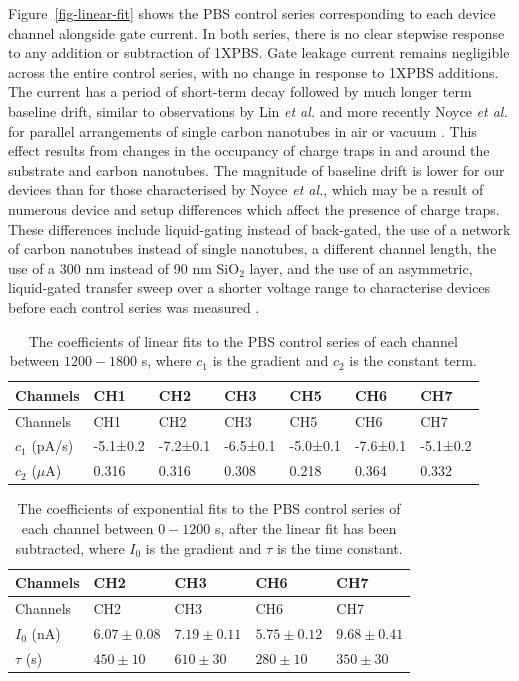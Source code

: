 \documentclass[
  a4paper,
]{scrbook}
\begin{document}
Figure~\ref{fig-linear-fit} shows the PBS control series corresponding
to each device channel alongside gate current. In both series, there is
no clear stepwise response to any addition or subtraction of 1XPBS. Gate
leakage current remains negligible across the entire control series,
with no change in response to 1XPBS additions. The current has a period
of short-term decay followed by much longer term baseline drift, similar
to observations by Lin \emph{et al.} and more recently Noyce \emph{et
al.} for parallel arrangements of single carbon nanotubes in air or
vacuum \autocite{Lin2006,Noyce2019}. This effect results from changes in
the occupancy of charge traps in and around the substrate and carbon
nanotubes. The magnitude of baseline drift is lower for our devices than
for those characterised by Noyce \emph{et al.}, which may be a result of
numerous device and setup differences which affect the presence of
charge traps. These differences include liquid-gating instead of
back-gated, the use of a network of carbon nanotubes instead of single
nanotubes, a different channel length, the use of a 300 nm instead of 90
nm SiO\(_2\) layer, and the use of an asymmetric, liquid-gated transfer
sweep over a shorter voltage range to characterise devices before each
control series was measured \autocite{Noyce2019}.

\hypertarget{tbl-linear-fits}{}
\begin{longtable}[]{@{}lllllll@{}}
\caption{\label{tbl-linear-fits}The coefficients of linear fits to the
PBS control series of each channel between \(1200-1800\) s, where
\(c_1\) is the gradient and \(c_2\) is the constant term.\\
}\tabularnewline
\toprule\noalign{}
Channels & CH1 & CH2 & CH3 & CH5 & CH6 & CH7 \\
\midrule\noalign{}
\endfirsthead
\toprule\noalign{}
Channels & CH1 & CH2 & CH3 & CH5 & CH6 & CH7 \\
\midrule\noalign{}
\endhead
\bottomrule\noalign{}
\endlastfoot
\(c_1\) (pA/s) & -5.1±0.2 & -7.2±0.1 & -6.5±0.1 & -5.0±0.1 & -7.6±0.1 &
-5.1±0.2 \\
\(c_2\) (\(\mu\)A) & 0.316 & 0.316 & 0.308 & 0.218 & 0.364 & 0.332 \\
\end{longtable}

\hypertarget{tbl-exp-fits}{}
\begin{longtable}[]{@{}lllll@{}}
\caption{\label{tbl-exp-fits}The coefficients of exponential fits to the
PBS control series of each channel between \(0-1200\) s, after the
linear fit has been subtracted, where \(I_0\) is the gradient and
\(\tau\) is the time constant.\\
}\tabularnewline
\toprule\noalign{}
Channels & CH2 & CH3 & CH6 & CH7 \\
\midrule\noalign{}
\endfirsthead
\toprule\noalign{}
Channels & CH2 & CH3 & CH6 & CH7 \\
\midrule\noalign{}
\endhead
\bottomrule\noalign{}
\endlastfoot
\(I_0\) (nA) & \(6.07\pm0.08\) & \(7.19\pm0.11\) & \(5.75\pm0.12\) &
\(9.68\pm0.41\) \\
\(\tau\) (s) & \(450\pm10\) & \(610\pm30\) & \(280\pm10\) &
\(350\pm30\) \\
\end{longtable}
\end{document}
